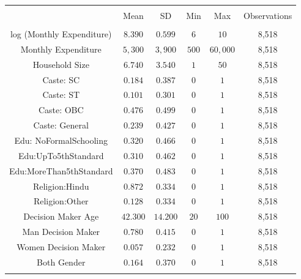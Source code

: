 
\begin{tabular}{@{\extracolsep{5pt}} cccccc} 
\\[-1.8ex]\hline 
\hline \\[-1.8ex] 
 & Mean & SD & Min & Max & Observations \\ 
\hline \\[-1.8ex] 
log (Monthly Expenditure) & $8.390$ & $0.599$ & $6$ & $10$ & 8,518 \\ 
Monthly Expenditure & $5,300$ & $3,900$ & $500$ & $60,000$ & 8,518 \\ 
Household Size & $6.740$ & $3.540$ & $1$ & $50$ & 8,518 \\ 
Caste: SC & $0.184$ & $0.387$ & $0$ & $1$ & 8,518 \\ 
Caste: ST & $0.101$ & $0.301$ & $0$ & $1$ & 8,518 \\ 
Caste: OBC & $0.476$ & $0.499$ & $0$ & $1$ & 8,518 \\ 
Caste: General & $0.239$ & $0.427$ & $0$ & $1$ & 8,518 \\ 
Edu: NoFormalSchooling & $0.320$ & $0.466$ & $0$ & $1$ & 8,518 \\ 
Edu:UpTo5thStandard & $0.310$ & $0.462$ & $0$ & $1$ & 8,518 \\ 
Edu:MoreThan5thStandard & $0.370$ & $0.483$ & $0$ & $1$ & 8,518 \\ 
Religion:Hindu & $0.872$ & $0.334$ & $0$ & $1$ & 8,518 \\ 
Religion:Other & $0.128$ & $0.334$ & $0$ & $1$ & 8,518 \\ 
Decision Maker Age & $42.300$ & $14.200$ & $20$ & $100$ & 8,518 \\ 
Man Decision Maker & $0.780$ & $0.415$ & $0$ & $1$ & 8,518 \\ 
Women Decision Maker & $0.057$ & $0.232$ & $0$ & $1$ & 8,518 \\ 
Both Gender & $0.164$ & $0.370$ & $0$ & $1$ & 8,518 \\ 
\hline \\[-1.8ex] 
\end{tabular} 
